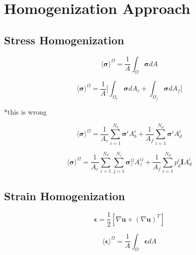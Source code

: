 \section{Homogenization Approach}

\subsection{Stress Homogenization}

\begin{equation}
\label{eqn:stress1}
\langle \boldsymbol{\sigma} \rangle^\Omega = 
\frac{1}{A} \int_\Omega \boldsymbol{\sigma} { dA}
\end{equation}

\begin{equation}
\label{eqn:stress2}
\langle \boldsymbol{\sigma} \rangle^\Omega = 
\frac{1}{A} \bigg \lbrack {\int_{\Omega_{r}} \boldsymbol{\sigma} { dA_r} + 
\int_{\Omega_{f}} \boldsymbol{\sigma} { dA_f}} \bigg \rbrack
\end{equation}

*this is wrong

\begin{equation}
\label{eqn:stress3}
\langle \boldsymbol{\sigma} \rangle^\Omega = 
\frac{1}{A_{r}} \sum_{i=1}^{N_{b}} \boldsymbol{\sigma}^{i} A_{b}^{i} + 
\frac{1}{A_{f}} \sum_{i=1}^{N_{d}} \boldsymbol{\sigma}^{i} A_{d}^{i}
\end{equation}

\begin{equation}
\label{eqn:stress4}
\langle \boldsymbol{\sigma} \rangle^\Omega = 
\frac{1}{A_{r}} \sum_{i=1}^{N_{b}} \sum_{j=1}^{N_{z}} \boldsymbol{\sigma}_z^{ij} A_{z}^{ij} + 
\frac{1}{A_{f}} \sum_{i=1}^{N_{d}} p_d^{i} \textbf{I} A_{d}^{i}
\end{equation}

\subsection{Strain Homogenization}

\begin{equation}
\label{eqn:strain1}
\boldsymbol{\epsilon} = 
\frac{1}{2}  \left[ \nabla \mathbf{u} + \left( \nabla \mathbf{u} \right)^{T} \right]
\end{equation}

\begin{equation}
\label{eqn:strain2}
\langle \boldsymbol{\epsilon} \rangle^\Omega = 
\frac{1}{A} \int_\Omega \boldsymbol{\epsilon} { dA}
\end{equation}

